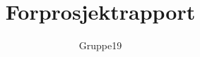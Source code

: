 \documentclass[11pt,a4paper,titlepage]{report}
\author{Gruppe19}
\title{Forprosjektrapport}
\begin{document}
\maketitle
\tableofcontents

\newcommand{\mw}{\emph{Making Waves}}
\newcommand{\es}{\emph{Elasticsearch}}
\newcommand{\rb}{\emph{Redd Barna}}
\newcommand{\cs}{C\nolinebreak\hspace{-.05em}\raisebox{.6ex}{\scriptsize\bf \#}}












	
\end{document}
